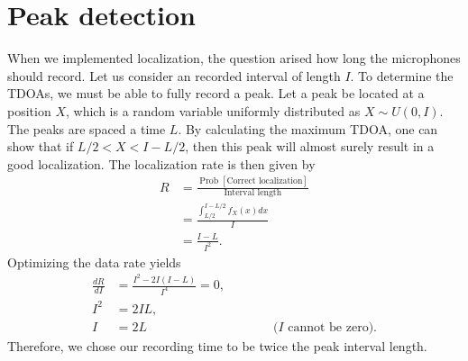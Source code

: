 \documentclass[11pt,titlepage]{report}
\begin{document}
\newcommand{\mat}[1]{\mathbf{#1}}

\chapter*{Peak detection}
When we implemented localization, the question arised how long the microphones should record. Let us consider an recorded interval of length $I$. To determine the TDOAs, we must be able to fully record a peak. Let a peak be located at a position $X$, which is a random variable uniformly distributed as $X \sim U(0,I)$. The peaks are spaced a time $L$. By calculating the maximum TDOA, one can show that if $L/2 < X < I-L/2$, then this peak will almost surely result in a good localization. The localization rate is then given by
\begin{align*}
	R &= \frac{\operatorname{Prob}\left[\text{Correct localization}\right]}{\text{Interval length}} \\
	&= \frac{\int_{L/2}^{I-L/2}f_{X}(x)dx}{I} \\
	&= \frac{I-L}{I^2}.
\end{align*}
Optimizing the data rate yields
\begin{align*}
	\frac{dR}{dI} &= \frac{I^2-2I(I-L)}{I^4} = 0, \\
	I^2 &= 2IL, \\
	I &= 2L \hspace{10em} \text{($I$ cannot be zero)}.
\end{align*}
Therefore, we chose our recording time to be twice the peak interval length.
\end{document}

